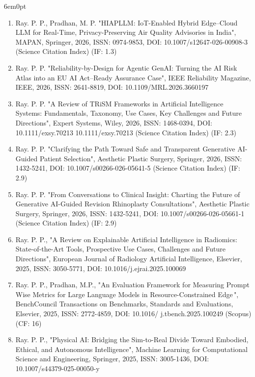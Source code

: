 \documentclass[11pt,a4paper]{moderncv}
\begin{document}
\begin{adjustwidth}{6em}{0pt}
\begin{enumerate}
		\item 	Ray. P. P., Pradhan, M. P. "HIAPLLM: IoT-Enabled Hybrid Edge–Cloud LLM for Real-Time, Privacy-Preserving Air Quality Advisories in India", MAPAN, Springer, 2026, ISSN: 0974-9853, DOI: 10.1007/s12647-026-00908-3 (Science Citation Index) (IF: 1.3) 
		
		\item 	Ray. P. P. "Reliability-by-Design for Agentic GenAI: Turning the AI Risk Atlas into an EU AI Act–Ready Assurance Case", IEEE Reliability Magazine, IEEE, 2026, ISSN: 2641-8819, DOI: 10.1109/MRL.2026.3660197
		
		
		\item Ray. P. P. "A Review of TRiSM Frameworks in Artificial Intelligence Systems: Fundamentals, Taxonomy, Use Cases, Key Challenges and Future Directions", Expert Systems, Wiley, 2026, ISSN: 1468-0394, DOI: 10.1111/exsy.70213 10.1111/exsy.70213 (Science Citation Index) (IF: 2.3) 
		
		\item Ray. P. P. "Clarifying the Path Toward Safe and Transparent Generative AI-Guided Patient Selection", Aesthetic Plastic Surgery, Springer, 2026, ISSN: 1432-5241, DOI: 10.1007/s00266-026-05641-5 (Science Citation Index) (IF: 2.9) 
		
		\item Ray. P. P. "From Conversations to Clinical Insight: Charting the Future of Generative AI-Guided Revision Rhinoplasty Consultations", Aesthetic Plastic Surgery, Springer, 2026, ISSN: 1432-5241, DOI: 10.1007/s00266-026-05661-1 (Science Citation Index) (IF: 2.9) 
		
		
		\item Ray. P. P., "A Review on Explainable Artificial Intelligence in Radiomics: State-of-the-Art Tools, Prospective Use Cases, Challenges and Future Directions", European Journal of Radiology Artificial Intelligence, Elsevier, 2025, ISSN: 3050-5771, DOI: 10.1016/j.ejrai.2025.100069 
		
		\item Ray. P. P., Pradhan, M.P., "An Evaluation Framework for Measuring Prompt Wise Metrics for Large Language Models in Resource-Constrained Edge ", BenchCouncil Transactions on Benchmarks, Standards and Evaluations, Elsevier, 2025, ISSN: 2772-4859, DOI: 10.1016/ j.tbench.2025.100249 (Scopus) (CF: 16) 
		
		\item Ray. P. P., "Physical AI: Bridging the Sim-to-Real Divide Toward Embodied, Ethical, and Autonomous Intelligence", Machine Learning for Computational Science and Engineering, Springer, 2025, ISSN: 3005-1436, DOI: 10.1007/s44379-025-00050-y
		

\end{enumerate}
\end{adjustwidth}
\end{document}
